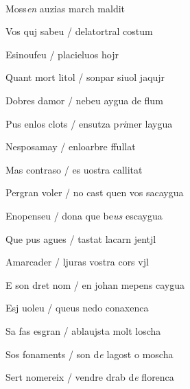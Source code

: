\documentclass[12pt]{article}
\renewcommand{\espaiAbansEtiquetaPoema}{\vspace{0ex}}
\begin{document}
\begin{estrofa}

\espaiAbansEtiquetaPoema

\\

\begin{rubrica}

\pagina{[155r]} \clauOberta Moss\textit{en} auzias march maldit \clauTancada

\end{rubrica}

\end{estrofa}


\begin{estrofa}

 Vos quj sabeu / delatortral costum

 Esinoufeu / placieluos hojr

 Quant mort litol / sonpar siuol jaqujr

 Dobres damor / nebeu aygua de flum

 Pus enlos clots / ensutza p\textit{ri}mer laygua

 Nesposamay / enloarbre ffullat

 Mas contraso / es uostra callitat

 Pergran voler / no cast quen vos sacaygua

\end{estrofa}



\begin{estrofa}

 Enopenseu / dona que be\textit{us} escaygua

 Que pus agues / tastat lacarn jentjl

 Amarcader / ljuras vostra cors vjl

 E son dret nom / en johan mepens caygua

 Esj uoleu / queus nedo conaxenca

 Sa fas esgran / ablaujsta molt loscha

 Sos fonaments / son d\textit{e} lagost o moscha

 Sert nomereix / vendre drab d\textit{e} florenca

\end{estrofa}
\end{document}
